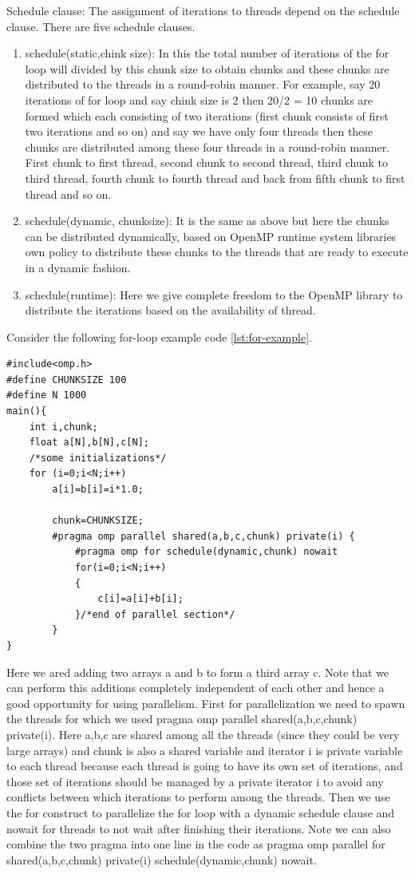 \documentclass[12pt]{article}
\begin{document}
Schedule clause: The assignment of iterations to threads depend on the schedule clause.
There are five schedule clauses. 
\begin{enumerate}
    \item schedule(static,chink size): In this the total number of iterations of the for loop will divided by this chunk size to obtain chunks and these chunks are distributed to the threads in a round-robin manner.
    For example, say 20 iterations of for loop and say chink size is 2 then 20/2 = 10 chunks are formed which each consisting of two iterations (first chunk consists of first two iterations and so on) and say we have only four threads then these chunks are distributed among these four threads in a round-robin manner.
    First chunk to first thread, second chunk to second thread, third chunk to third thread, fourth chunk to fourth thread and back from fifth chunk to first thread and so on.
    \item schedule(dynamic, chunksize): It is the same as above but here the chunks can be distributed dynamically, based on  OpenMP runtime system libraries own policy to distribute these chunks to the 
    threads that are ready to execute in a dynamic fashion.
    \item schedule(runtime): Here we give complete freedom to the OpenMP library to distribute the iterations based on the availability of thread.
\end{enumerate}

Consider the following for-loop example code \ref{lst:for-example}.
\begin{lstlisting}[caption={for-Example: Addition of two Arrays},captionpos=b,label={lst:for-example}]
#include<omp.h>
#define CHUNKSIZE 100
#define N 1000
main(){
    int i,chunk;
    float a[N],b[N],c[N];
    /*some initializations*/
    for (i=0;i<N;i++)
        a[i]=b[i]=i*1.0;
    
        chunk=CHUNKSIZE;
        #pragma omp parallel shared(a,b,c,chunk) private(i) {
            #pragma omp for schedule(dynamic,chunk) nowait
            for(i=0;i<N;i++)
            {
                c[i]=a[i]+b[i];
            }/*end of parallel section*/
        }
}
\end{lstlisting}

Here we ared adding two arrays a and b to form a third array c.
Note that we can perform this additions completely independent of each other and hence a good opportunity 
for using parallelism.
First for parallelization we need to spawn the threads for which we used pragma omp parallel shared(a,b,c,chunk) private(i).
Here a,b,c are shared among all the threads (since they could be very large arrays) and chunk is also a shared variable and iterator i is private variable to each thread because each thread is going to 
have its own set of iterations, and those set of iterations should be managed by a private iterator i to avoid any conflicts between which iterations to perform among the threads. 
Then we use the for construct to parallelize the for loop with a dynamic schedule clause and nowait for threads to not wait after finishing their iterations.
Note we can also combine the two pragma into one line in the code as pragma omp parallel for shared(a,b,c,chunk) private(i) schedule(dynamic,chunk) nowait.
\end{document}
